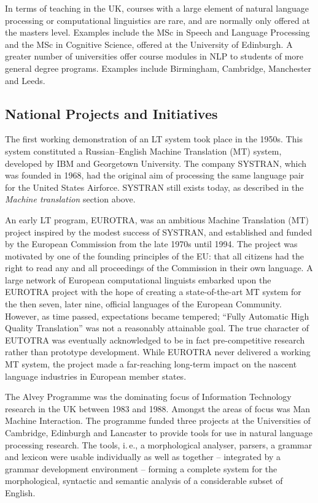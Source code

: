 \documentclass[]{../../metanetpaper}
\begin{document}
\begin{multicols}{2}
In terms of teaching in the UK, courses with a large element of natural language processing or computational linguistics are rare, and are normally only offered at the masters level. Examples include the MSc in Speech and Language Processing and the MSc in Cognitive Science, offered at the University of Edinburgh. A greater number of universities offer course modules in NLP to students of more general degree programs. Examples include Birmingham, Cambridge, Manchester and Leeds. 

\subsection{National Projects and Initiatives}

The first working demonstration of an LT system took place in the 1950s. This system constituted a Russian--English Machine Translation (MT) system, developed by IBM and Georgetown University. The company SYSTRAN, which was founded in 1968, had the original aim of processing the same language pair for the United States Airforce. SYSTRAN still exists today, as described in the \textit{Machine translation} section above.

An early LT program, EUROTRA, was an ambitious Machine Translation (MT) project inspired by the modest success of SYSTRAN, and established and funded by the European Commission from the late 1970s until 1994. The project was motivated by one of the founding principles of the EU: that all citizens had the right to read any and all proceedings of the Commission in their own language. A large network of European computational linguists embarked upon the EUROTRA project with the hope of creating a state-of-the-art MT system for the then seven, later nine, official languages of the European Community. However, as time passed, expectations became tempered; ``Fully Automatic High Quality Translation'' was not a reasonably attainable goal. The true character of EUTOTRA was eventually acknowledged to be in fact pre-competitive research rather than prototype development. While EUROTRA never delivered a working MT system, the project made a far-reaching long-term impact on the nascent language industries in European member states.

The Alvey Programme was the dominating focus of Information Technology research in the UK between 1983 and 1988. Amongst the areas of focus was Man Machine Interaction. The programme funded three projects at the Universities of Cambridge, Edinburgh and Lancaster to provide tools for use in natural language processing research. The tools, i.\,e., a morphological analyser, parsers, a grammar and lexicon were usable individually as well as together -- integrated by a grammar development environment -- forming a complete system for the morphological, syntactic and semantic analysis of a considerable subset of English.


\end{multicols}
\end{document}
